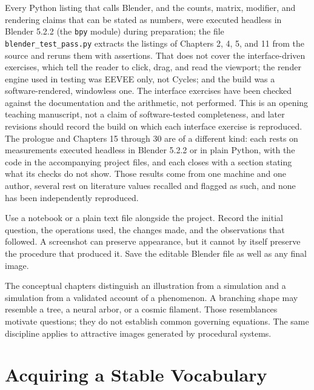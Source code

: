 \documentclass[11pt,openany]{book}
\begin{document}
\begin{checkpoint}
Every Python listing that calls Blender, and the counts, matrix, modifier, and rendering claims that can be stated as numbers, were executed headless in Blender 5.2.2 (the \texttt{bpy} module) during preparation; the file \texttt{blender\_test\_pass.py} extracts the listings of Chapters 2, 4, 5, and 11 from the source and reruns them with assertions. That does not cover the interface-driven exercises, which tell the reader to click, drag, and read the viewport; the render engine used in testing was EEVEE only, not Cycles; and the build was a software-rendered, windowless one. The interface exercises have been checked against the documentation and the arithmetic, not performed. This is an opening teaching manuscript, not a claim of software-tested completeness, and later revisions should record the build on which each interface exercise is reproduced. The prologue and Chapters 15 through 30 are of a different kind: each rests on measurements executed headless in Blender 5.2.2 or in plain Python, with the code in the accompanying project files, and each closes with a section stating what its checks do not show. Those results come from one machine and one author, several rest on literature values recalled and flagged as such, and none has been independently reproduced.
\end{checkpoint}

Use a notebook or a plain text file alongside the project. Record the initial question, the operations used, the changes made, and the observations that followed. A screenshot can preserve appearance, but it cannot by itself preserve the procedure that produced it. Save the editable Blender file as well as any final image.

The conceptual chapters distinguish an illustration from a simulation and a simulation from a validated account of a phenomenon. A branching shape may resemble a tree, a neural arbor, or a cosmic filament. Those resemblances motivate questions; they do not establish common governing equations. The same discipline applies to attractive images generated by procedural systems.



\mainmatter

\part{Acquiring a Stable Vocabulary}
\end{document}
